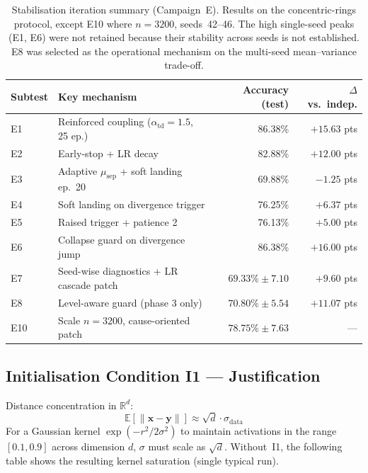 \documentclass[11pt,a4paper]{article}
\begin{document}
\begin{table}[h]
\centering
\footnotesize
\setlength{\tabcolsep}{4pt}
\begin{tabular}{llrr}
\toprule
\textbf{Subtest} & \textbf{Key mechanism} & \textbf{Accuracy (test)} & \textbf{$\Delta$ vs.\ indep.} \\
\midrule
E1  & Reinforced coupling ($\alpha_{\mathrm{td}}=1.5$, 25 ep.) & 86.38\%            & $+15.63$ pts \\
E2  & Early-stop + LR decay                                    & 82.88\%            & $+12.00$ pts \\
E3  & Adaptive $\mu_{\mathrm{sep}}$ + soft landing ep.\ 20     & 69.88\%            & $-1.25$ pts  \\
E4  & Soft landing on divergence trigger                       & 76.25\%            & $+6.37$ pts  \\
E5  & Raised trigger + patience 2                              & 76.13\%            & $+5.00$ pts  \\
E6  & Collapse guard on divergence jump                        & 86.38\%            & $+16.00$ pts \\
E7  & Seed-wise diagnostics + LR cascade patch                 & $69.33\% \pm 7.10$ & $+9.60$ pts  \\
E8  & Level-aware guard (phase 3 only)                         & $70.80\% \pm 5.54$ & $+11.07$ pts \\
E10 & Scale $n=3200$, cause-oriented patch                     & $78.75\% \pm 7.63$ & ---          \\
\bottomrule
\end{tabular}
\caption{Stabilisation iteration summary (Campaign~E). Results on the concentric-rings
protocol, except E10 where $n=3200$, seeds~42--46. The high single-seed peaks (E1, E6)
were not retained because their stability across seeds is not established. E8 was
selected as the operational mechanism on the multi-seed mean--variance trade-off.}
\label{tab:campaign_e_detail}
\end{table}

\subsection{Initialisation Condition I1 --- Justification}

Distance concentration in $\mathbb{R}^d$:
\begin{equation}
  \mathbb{E}[\|\mathbf{x} - \mathbf{y}\|] \approx \sqrt{d}\cdot\sigma_{\mathrm{data}}
\end{equation}
For a Gaussian kernel $\exp(-r^2/2\sigma^2)$ to maintain activations in the range
$[0.1, 0.9]$ across dimension $d$, $\sigma$ must scale as $\sqrt{d}$. Without~I1, the
following table shows the resulting kernel saturation (single typical run).
\end{document}
